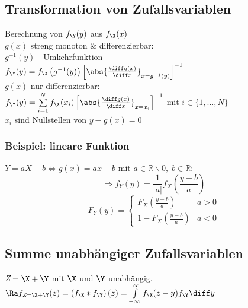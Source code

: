 \documentclass[german,color,6pt]{latex4ei/latex4ei_sheet}
\begin{document}
\begin{sectionbox}
	\subsection{Transformation von Zufallsvariablen}
	Berechnung von $f_{\Y}(y)$ aus $f_{\X}(x)$\\
	$g(x)$ streng monoton \& differenzierbar:\\
	$g^{-1}(y)$ - Umkehrfunktion\\
	$f_{\Y}(y) = f_{\X}\left(g^{-1}(y)\right)\left[\abs{\frac{\diff g(x)}{\diff x}}_{x = g^{-1}(y)}\right]^{-1}$\\
	$g(x)$ nur differenzierbar:\\
	$f_{\Y}(y) = \sum\limits_{i = 1}^{N}{f_{\X}(x_i)\left[\abs{\frac{\diff g(x)}{\diff x}}_{x = x_i}\right]^{-1}}$ mit $i \in \{1,\dots,N\}$ \\
	$x_i$ sind Nullstellen von $y - g(x) = 0$
	\subsubsection{Beispiel: lineare Funktion}
	$Y=aX+b \Leftrightarrow g(x)=ax+b$ mit $a\in\mathbb{R}\backslash 0,\;b\in\mathbb{R}$:
	\[\Rightarrow f_Y(y)=\frac{1}{|a|}f_X\left(\frac{y-b}{a}\right)\]
	\[F_Y(y)=\begin{cases}F_X\left(\frac{y-b}{a}\right) & a>0 \\ 1-F_X\left(\frac{y-b}{a}\right) & a<0\end{cases}\]
	
\end{sectionbox}

\begin{sectionbox}
	\subsection{Summe unabhängiger Zufallsvariablen}
	$\textit{Z} = \X + \Y$ mit $\X$ und $\Y$ unabhängig.\\
	$\Ra f_{\textit{Z} = \X + \Y}(z) = \left(f_{\X} \ast f_{\Y}\right)(z) = \int\limits_{-\infty}^{\infty}{f_{\X}(z-y)f_{\Y}\diff y}$
\end{sectionbox}



\end{document}
